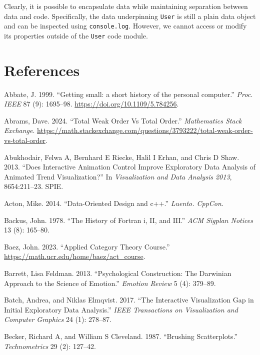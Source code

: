 \documentclass[
]{book}
\newlength{\cslhangindent}
\newenvironment{CSLReferences}[2] %
 {\begin{list}{}{%
  \setlength{\itemindent}{0pt}
  \setlength{\leftmargin}{0pt}
  \setlength{\parsep}{0pt}
  \ifodd #1
   \setlength{\leftmargin}{\cslhangindent}
   \setlength{\itemindent}{-1\cslhangindent}
  \fi
  \setlength{\itemsep}{#2\baselineskip}}}
 {\end{list}}
\theoremstyle{definition}
\theoremstyle{definition}
\theoremstyle{definition}
\theoremstyle{definition}
\theoremstyle{remark}
\begin{document}
Clearly, it is possible to encapsulate data while maintaining separation between data and code. Specifically, the data underpinning \texttt{User} is still a plain data object and can be inspected using \texttt{console.log}. However, we cannot access or modify its properties outside of the \texttt{User} code module.

\chapter{References}\label{references}

\label{refs}
\begin{CSLReferences}{1}{0}
Abbate, J. 1999. {``{Getting small: a short history of the personal computer}.''} \emph{Proc. IEEE} 87 (9): 1695--98. \url{https://doi.org/10.1109/5.784256}.

Abrams, Dave. 2024. {``Total Weak Order Vs Total Order.''} \emph{Mathematics Stack Exchange}. \url{https://math.stackexchange.com/questions/3793222/total-weak-order-vs-total-order}.

Abukhodair, Felwa A, Bernhard E Riecke, Halil I Erhan, and Chris D Shaw. 2013. {``Does Interactive Animation Control Improve Exploratory Data Analysis of Animated Trend Visualization?''} In \emph{Visualization and Data Analysis 2013}, 8654:211--23. SPIE.

Acton, Mike. 2014. {``Data-Oriented Design and c++.''} \emph{Luento. CppCon}.

Backus, John. 1978. {``The History of Fortran i, II, and III.''} \emph{ACM Sigplan Notices} 13 (8): 165--80.

Baez, John. 2023. {``{Applied Category Theory Course}.''} \url{https://math.ucr.edu/home/baez/act_course}.

Barrett, Lisa Feldman. 2013. {``Psychological Construction: The Darwinian Approach to the Science of Emotion.''} \emph{Emotion Review} 5 (4): 379--89.

Batch, Andrea, and Niklas Elmqvist. 2017. {``The Interactive Visualization Gap in Initial Exploratory Data Analysis.''} \emph{IEEE Transactions on Visualization and Computer Graphics} 24 (1): 278--87.

Becker, Richard A, and William S Cleveland. 1987. {``Brushing Scatterplots.''} \emph{Technometrics} 29 (2): 127--42.


\end{CSLReferences}
\end{document}
